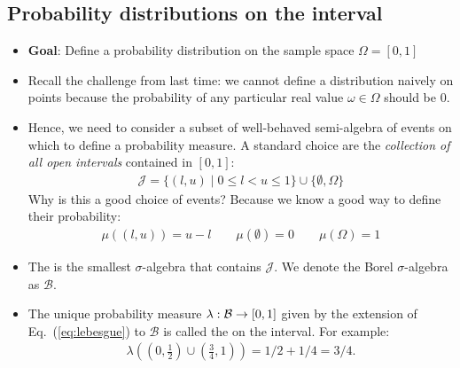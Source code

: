 \documentclass{tufte-handout}
\begin{document}
\subsection{Probability distributions on the interval}
\begin{itemize}
  \item \textbf{Goal}: Define a probability distribution on the sample space
  $\Omega = [0,1]$

  \item Recall the challenge from last time: we cannot define a distribution 
  naively on points because the probability of any particular real value $\omega
  \in \Omega$ should be 0.

  \item Hence, we need to consider a subset of well-behaved semi-algebra of
  events on which to define a probability measure. A standard choice are the
  \emph{collection of all open intervals} contained in $[0,1]$:
  \begin{align*}
    \mathcal{J} = \{(l, u) \mid 0 \le l < u \le 1 \} \cup \{\emptyset, \Omega\}
  \end{align*}
  Why is this a good choice of events? Because we know a good way to define their 
  probability:
  \begin{align}
    \mu((l, u)) = u - l \qquad \mu(\emptyset) = 0 \qquad \mu(\Omega) = 1
    \label{eq:lebesgue}
  \end{align}

  \item The  is the smallest $\sigma$-algebra that contains
  $\mathcal{J}$. We denote the Borel $\sigma$-algebra as $\mathcal{B}$. 

  \item The unique probability measure $\lambda: \mathcal{B} \rightarrow [0,1]$ given
  by the extension of Eq.~(\ref{eq:lebesgue}) to $\mathcal{B}$ is called the
   on the interval. For example:
  \begin{align*}
    \lambda\left((0, \frac{1}{2}) \cup (\frac{3}{4}, 1) \right) = 1/2 + 1/4 = 3/4.
  \end{align*}
  



\end{itemize}
\end{document}
